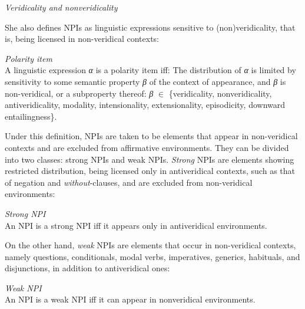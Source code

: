 \documentclass[output=paper]{langscibook}
\begin{document}
\ea\label{gia:ex4}
\textit{Veridicality and nonveridicality} \citep[33]{giannaki2002licensing}
\z
\z

\noindent She also defines NPIs as linguistic expressions sensitive to (non)veridicality, that is, being licensed in non-veridical contexts:

\ea\label{gia:ex5} \textit{Polarity item} \citep[669]{giannaki2001free} \\
A linguistic expression \textit{α} is a polarity item iff:
\ea The distribution of \textit{α} is limited by sensitivity to some semantic property \textit{β} of the context of appearance, and
\ex \textit{β} is non-veridical, or a subproperty thereof: \textit{β} $\in$ \{veridicality, nonveridicality, antiveridicality, modality, intensionality, extensionality, episodicity, downward entailingness\}.
\z\z

\noindent Under this definition, NPIs are taken to be elements that appear in non-veridical contexts and are excluded from affirmative environments. They can be divided into two classes: strong NPIs and weak NPIs. \textit{Strong} NPIs are elements showing restricted distribution, being licensed only in antiveridical contexts, such as that of negation and \textit{without}-clauses, and are excluded from non-veridical environments:

\begin{exe}
\ex\label{gia:ex6}
\textit{Strong NPI}\\
An NPI is a strong NPI iff it appears only in antiveridical environments.
\end{exe}

\noindent On the other hand, \textit{weak} NPIs are elements that occur in non-veridical contexts, namely questions, conditionals, modal verbs, imperatives, generics, habituals, and disjunctions, in addition to antiveridical ones:

\begin{exe}
\ex\label{gia:ex7}
\textit{Weak NPI}\\
An NPI is a weak NPI iff it can appear in nonveridical environments.
\end{exe}
\end{document}

